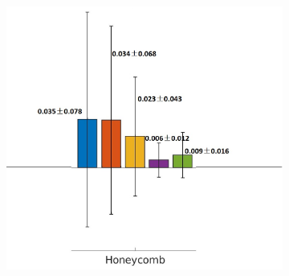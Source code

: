\begin{figure}[H]
\begin{subfigure}{.46\linewidth}
  \includegraphics[width=\linewidth,trim={{.0\wd0} {.0\wd0} {.0\wd0} {.0\wd0}},clip]{QuantitativeAnalysis/Image/HoneycombLobarRegionDiseaseDistribution.jpg} %

\end{subfigure}
\end{figure}
